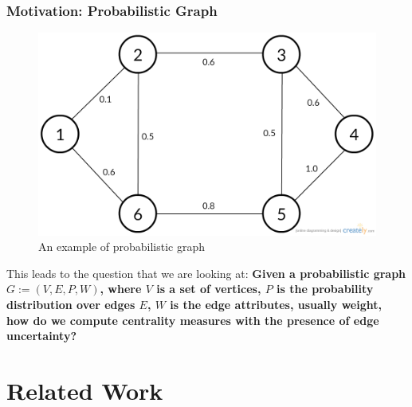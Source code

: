 \documentclass[10pt]{beamer}
\begin{document}
\begin{frame}
\frametitle{Motivation: Probabilistic Graph}
\begin{figure}[H]
\centering
\includegraphics[scale = 0.2]{probabilistic_graph.png}
\caption{An example of probabilistic graph}
\end{figure}
\vspace{-0.28in}
This leads to the question that we are looking at: \textbf{Given a probabilistic graph $G := (V,E,P,W)$, where $V$ is a set of vertices, $P$ is the probability distribution over edges $E$, $W$ is the edge attributes, usually weight, how do we compute centrality measures with the presence of edge uncertainty?}
\end{frame}

\section{Related Work}
\end{document}
